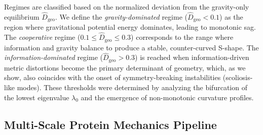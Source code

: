 Regimes are classified based on the normalized deviation from the gravity-only equilibrium $\widehat{D}_{\mathrm{geo}}$. We define the \emph{gravity-dominated} regime ($\widehat{D}_{\mathrm{geo}} < 0.1$) as the region where gravitational potential energy dominates, leading to monotonic sag. The \emph{cooperative} regime ($0.1 \leq \widehat{D}_{\mathrm{geo}} \leq 0.3$) corresponds to the range where information and gravity balance to produce a stable, counter-curved S-shape. The \emph{information-dominated} regime ($\widehat{D}_{\mathrm{geo}} > 0.3$) is reached when information-driven metric distortions become the primary determinant of geometry, which, as we show, also coincides with the onset of symmetry-breaking instabilities (scoliosis-like modes). These thresholds were determined by analyzing the bifurcation of the lowest eigenvalue $\lambda_0$ and the emergence of non-monotonic curvature profiles.

\subsection{Multi-Scale Protein Mechanics Pipeline}


